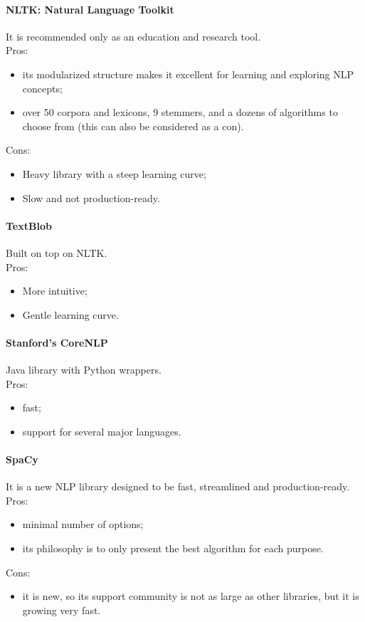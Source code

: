 \paragraph{NLTK: Natural Language Toolkit}
It is recommended only as an education and research tool. \\
Pros:
\begin{itemize}
\item its modularized structure makes it excellent for learning and exploring NLP concepts; 
\item over 50 corpora and lexicons, 9 stemmers, and a dozens of algorithms to choose from (this can also be considered as a con).
\end{itemize}
Cons: 
\begin{itemize}
\item Heavy library with a steep learning curve;
\item Slow and not production-ready. 
\end{itemize}

\paragraph{TextBlob}
Built on top on NLTK.\\
Pros: 
\begin{itemize}
\item More intuitive; 
\item Gentle learning curve. 
\end{itemize} 

\paragraph{Stanford's CoreNLP}
Java library with Python wrappers. \\
Pros:
\begin{itemize}
\item fast;
\item support for several major languages. 
\end{itemize}

\paragraph{SpaCy}
It is a new NLP library designed to be fast, streamlined and production-ready.\\
Pros:
\begin{itemize}
\item minimal number of options;
\item its philosophy is to only present the best algorithm for each purpose. 
\end{itemize}
Cons:
\begin{itemize}
\item it is new, so its support community is not as large as other libraries, but it is growing very fast.
\end{itemize}





